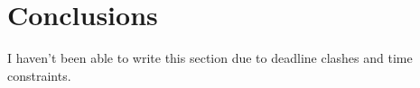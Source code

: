 \chapter{Conclusions}

\begin{tcolorbox}[colback=red!5!white,colframe=red!75!black,title=Not present in draft]
    I haven't been able to write this section due to deadline clashes and time constraints.
\end{tcolorbox}